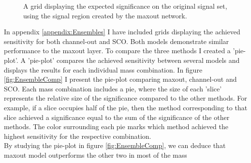 \begin{figure}
    \caption{A grid displaying the expected significance on the original signal set, using the signal region 
    created by the maxout network.}
    \label{fig:MaxOutGridSig}
\end{figure}
In appendix \ref{appendix:Ensembles} I have included grids displaying the achieved sensitivity for both channel-out and \ac{SCO}. Both 
models demonstrate similar performance to the maxout layer. To compare the three methods I created a 'pie-plot'. A 'pie-plot' 
compares the achieved sensitivity between several models and displays the results for each individual mass combination.  In figure 
\ref{fig:EnsembleComp} I present the pie-plot comparing maxout, channel-out and \ac{SCO}. Each mass combination includes a pie, where 
the size of each 'slice' represents the relative size of the significance compared to the other methods. For example, if a slice occupies 
half of the pie, then the method corresponding to that slice achieved a significance equal to the sum of the significance of the other methods.
The color surrounding each pie marks which method achieved the highest sensitivity for the respective combination.
\\
By studying the pie-plot in figure \ref{fig:EnsembleComp}, we can deduce that maxout model outperforms the other two in most of the mass 
